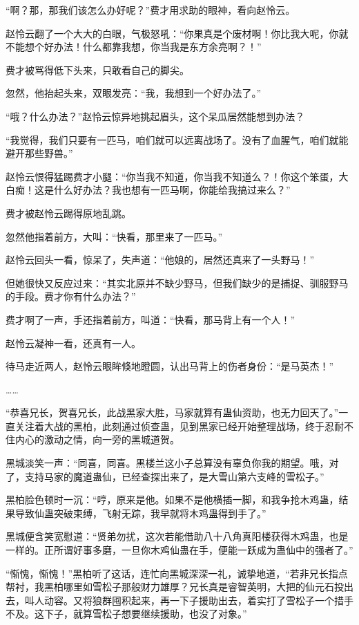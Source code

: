 \begin{this_body}
“啊？那，那我们该怎么办好呢？”费才用求助的眼神，看向赵怜云。

赵怜云翻了一个大大的白眼，气极怒吼：“你果真是个废材啊！你比我大呢，你就不能想个好办法！什么都靠我想，你当我是东方余亮啊？！”

费才被骂得低下头来，只敢看自己的脚尖。

忽然，他抬起头来，双眼发亮：“我，我想到一个好办法了。”

“哦？什么办法？”赵怜云惊异地挑起眉头，这个呆瓜居然能想到办法？

“我觉得，我们只要有一匹马，咱们就可以远离战场了。没有了血腥气，咱们就能避开那些野兽。”

赵怜云恨得猛踢费才小腿：“你当我不知道，你当我不知道么？！你这个笨蛋，大白痴！这是什么好办法？我也想有一匹马啊，你能给我搞过来么？”

费才被赵怜云踢得原地乱跳。

忽然他指着前方，大叫：“快看，那里来了一匹马。”

赵怜云回头一看，惊呆了，失声道：“他娘的，居然还真来了一头野马！”

但她很快又反应过来：“其实北原并不缺少野马，但我们缺少的是捕捉、驯服野马的手段。费才你有什么办法？”

费才啊了一声，手还指着前方，叫道：“快看，那马背上有一个人！”

赵怜云凝神一看，还真有一人。

待马走近两人，赵怜云眼眸倏地瞪圆，认出马背上的伤者身份：“是马英杰！”

……

“恭喜兄长，贺喜兄长，此战黑家大胜，马家就算有蛊仙资助，也无力回天了。”一直关注着大战的黑柏，此刻通过侦查蛊，见到黑家已经开始整理战场，终于忍耐不住内心的激动之情，向一旁的黑城道贺。

黑城淡笑一声：“同喜，同喜。黑楼兰这小子总算没有辜负你我的期望。哦，对了，支持马家的魔道蛊仙，已经查探出来了，是大雪山第六支峰的雪松子。”

黑柏脸色顿时一沉：“哼，原来是他。如果不是他横插一脚，和我争抢木鸡蛊，结果导致仙蛊突破束缚，飞射无踪，我早就将木鸡蛊得到手了。”

黑城便含笑宽慰道：“贤弟勿扰，这次若能借助八十八角真阳楼获得木鸡蛊，也是一样的。正所谓好事多磨，一旦你木鸡仙蛊在手，便能一跃成为蛊仙中的强者了。”

“惭愧，惭愧！”黑柏听了这话，连忙向黑城深深一礼，诚挚地道，“若非兄长指点帮衬，我黑柏哪里如雪松子那般财力雄厚？兄长真是睿智英明，大把的仙元石投出去，叫人动容。又将狼群囤积起来，再一下子援助出去，着实打了雪松子一个措手不及。这下子，就算雪松子想要继续援助，也没了对象。”


\end{this_body}

